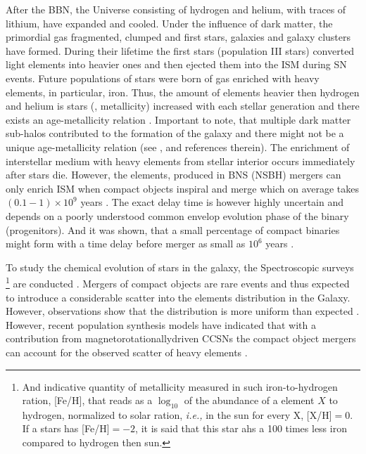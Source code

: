 After the \ac{BBN}, the Universe consisting of hydrogen and helium, with traces of lithium, have expanded and cooled. Under the influence of dark matter, the primordial gas fragmented, clumped and first stars, galaxies and galaxy clusters have formed. During their lifetime the first stars (population III stars) converted light elements into heavier ones and then ejected them into the \ac{ISM} during \ac{SN} events. Future populations of stars were born of gas enriched with heavy elements, in particular, iron. Thus, the amount of elements heavier then hydrogen and helium is stars (\ie, metallicity) increased with each stellar generation and there exists an age-metallicity relation  \citep{Matteucci:2012}. Important to note, that multiple dark matter sub-halos contributed to the formation of the galaxy and there might not be a unique age-metallicity relation (see \eg, \citet{Ishimaru:2015} and references therein).
The enrichment of interstellar medium with heavy elements from stellar interior occurs immediately after stars die. However, the \rproc{} elements, produced in \ac{BNS} (\ac{NSBH}) mergers can only enrich \ac{ISM} when compact objects inspiral and merge which on average takes $(0.1-1)\times10^{9}$ years \citep{DeDonder:2004cx,Dominik:2012kk}. The exact delay time is however highly uncertain and depends on a poorly understood common envelop evolution phase of the binary (progenitors). And it was shown, that a small percentage of compact binaries might form with a time delay before merger as small as $10^{6}$ years \citep{Dominik:2012kk}. 

To study the chemical evolution of stars in the galaxy, the Spectroscopic surveys \footnote{And indicative quantity of metallicity measured in such iron-to-hydrogen ration, [Fe/H], that reads as a $\log_{10}$ of the abundance of a element $X$ to hydrogen, normalized to solar ration, \textit{i.e.,} in the sun for every X, [X/H]$= 0$. If a stars has [Fe/H]$=-2$, it is said that this star ahs a 100 times less iron compared to hydrogen then sun.} are conducted \citep{Edvardsson:1993,Suda:2008na}. 
Mergers of compact objects are rare events and thus expected to introduce a considerable scatter into the \rproc{} elements distribution in the Galaxy. However, observations show that the distribution is more uniform than expected \citep{Argast:2003he}.
However, recent population synthesis models have indicated that with a contribution from magnetorotationallydriven \acp{CCSN} the compact object mergers can account for the observed scatter of heavy elements \citep{Ishimaru:2015,Cescutti:2015,Wehmeyer:2015,VanDeVoort:2015}.

